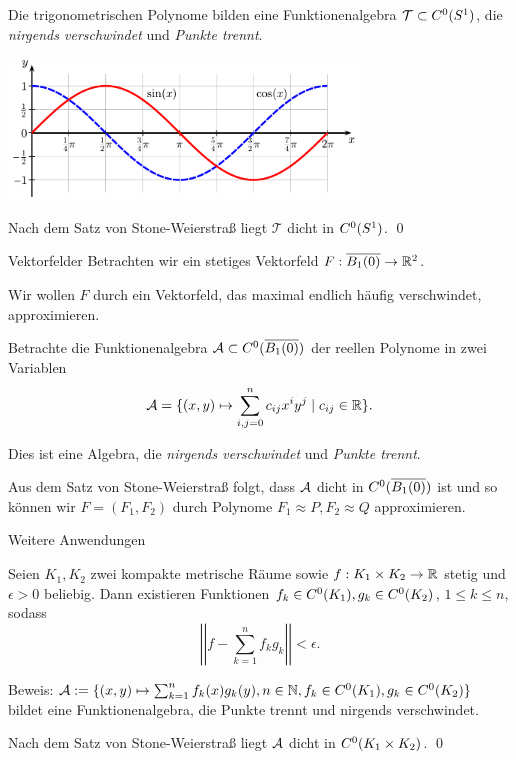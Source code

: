 \begin{frame}
    Die trigonometrischen Polynome bilden eine Funktionenalgebra \( \mathcal{T} \subset C^0(S^1) \), 
    die \textit{nirgends verschwindet} und \textit{Punkte trennt}.
    \pause 

    \begin{center}
        \includegraphics[width=0.7\textwidth]{images/sin-cos.pdf}
    \end{center}
    \pause

    Nach dem Satz von Stone-Weierstraß liegt \( \mathcal{T} \) dicht in \( C^0(S^1) \). \qed
\end{frame}

\newcommand{\B}{\overline{B_1(0)}}

\begin{frame}{Vektorfelder}
    Betrachten wir ein stetiges Vektorfeld 
    \( \abb{F}{\B}{\R^2} \).\pause

    Wir wollen \( F \) durch ein Vektorfeld, das maximal endlich 
    häufig verschwindet, approximieren.
    \pause

    Betrachte die Funktionenalgebra \( \A \subset \C(\B) \) 
    der reellen Polynome in zwei Variablen \pause
    \[ \mathcal{A} = \{ (x, y) \mapsto \sum_{i,j=0}^n c_{ij} x^i y^j \;|\; c_{ij} \in \mathbb{R} \}. \]
    \pause

    Dies ist eine Algebra, die \textit{nirgends verschwindet} und \textit{Punkte trennt}.
    \pause

    Aus dem Satz von Stone-Weierstraß folgt, dass \(\mathcal{A}\) dicht in \( \C(\B) \) ist 
    und so können wir \( F = (F_1, F_2) \) durch Polynome 
    \( F_1 \approx P, F_2 \approx Q \) approximieren.
\end{frame}

\begin{frame}{Weitere Anwendungen}
    \begin{kor}
        Seien \(K_1, K_2\) zwei kompakte metrische Räume
        sowie \( f:K_1 \times K_2\rightarrow \mathbb{R} \) stetig und \(\epsilon > 0\) beliebig.
        \pause
        Dann existieren Funktionen 
        \(f_k \in C^0(K_1), g_k \in C^0(K_2)\), 
        \(1 \leq k \leq n\),
        sodass 
        \[ \left|\left| f - \sum_{k=1}^n f_k g_k \right|\right| < \epsilon. \]
    \end{kor}
    \pause
    Beweis: \pause
    \( \mathcal{A} := \{ (x,y) \mapsto \sum_{k=1}^n f_k(x) g_k(y), 
    n\in \mathbb{N}, f_k \in C^0(K_1), g_k \in C^0(K_2)\} \) bildet eine Funktionenalgebra, 
    die Punkte trennt und nirgends verschwindet. 
    \pause

    Nach dem Satz von Stone-Weierstraß liegt 
    \(\mathcal{A}\) dicht in \( C^0(K_1 \times K_2) \).
    \qed
\end{frame}